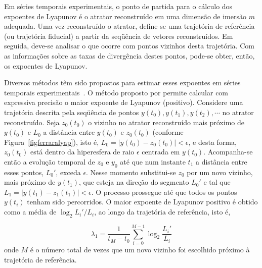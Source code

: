 Em séries temporais experimentais, o ponto de partida para o cálculo dos expoentes de Lyapunov é o atrator reconstruído em uma dimensão de imersão $m$ adequada. Uma vez reconstruído o atrator, define-se uma trajetória de referência (ou trajetória fiducial) a partir da seqüência de vetores reconstruídos. Em seguida, deve-se analisar o que ocorre com pontos vizinhos desta trajetória. Com as informações sobre as taxas de divergência destes pontos, pode-se obter, então, os expoentes de Lyapunov. 

Diversos métodos têm sido propostos para estimar esses expoentes em séries temporais experimentais~\cite{wolf/85,eckrue/86,sanosawada/85}. O método proposto por  permite calcular com expressiva precisão o maior expoente de Lyapunov (positivo). Considere uma trajetória descrita pela seqüência de pontos $y(t_0), y(t_1), y(t_2),\cdots$ no atrator reconstruído. Seja $z_0(t_0)$ o vizinho no atrator reconstruído mais próximo de $y(t_0)$ e $L_0$ a distância entre $y(t_0)$ e $z_0(t_0)$ (conforme Figura~\ref{figferraralyap}), isto é, $L_0=\left|y(t_0)-z_0(t_0)\right|<\epsilon$, e desta forma, $z_0(t_0)$ está dentro da hiperesfera de raio $\epsilon$ centrada em $y(t_0)$. Acompanha-se então a evolução temporal de $z_0$ e $y_0$ até que num instante $t_1$ a distância entre esses pontos, $L_0{'}$, exceda $\epsilon$. Nesse momento substitui-se $z_0$ por um novo vizinho, mais próximo de $y(t_1)$, que esteja na direção do segmento $L_0{'}$ e tal que $L_1=\left|y(t_1)-z_1(t_1)\right|<\epsilon$. O processo prossegue até que todos os pontos $y(t_i)$ tenham sido percorridos. O maior expoente de Lyapunov positivo é obtido como a média de $\log_{2} L_i{'}/L_i$, ao longo da trajetória de referência, isto é,

\begin{equation}
\lambda_{1}=\frac{1}{t_{M}-t_{0}}\sum_{i=0}^{M-1}\log_{2}\frac{L_i{'}}{L_i}
\label{lyap2}
\end{equation}
onde $M$ é o número total de vezes que um novo vizinho foi escolhido próximo à trajetória de referência.

